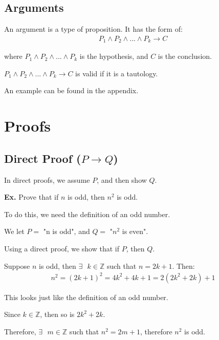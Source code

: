 \documentclass[12pt,letterpaper]{article} \usepackage{amsmath} \usepackage{graphicx}  \usepackage{longtable}  \usepackage{amssymb}
\begin{document}
        \subsection{Arguments}
        An argument is a type of proposition. It has the form of: 
        \begin{align*}
            P_1 \land P_2 \land ... \land P_k \rightarrow C
        \end{align*}

        where $P_1 \land P_2 \land ... \land P_k$ is the hypothesis, and $C$ is the conclusion. 

        $P_1 \land P_2 \land ... \land P_k \rightarrow C$ is valid if it is a tautology. 

        An example can be found in the appendix.

    \section{Proofs}

        \subsection{Direct Proof ($P \rightarrow Q$)}
        In direct proofs, we assume $P$, and then show $Q$. 

        \begin{mdframed}
            \textbf{Ex. } Prove that if $n$ is odd, then $n^2$ is odd.

            To do this, we need the definition of an odd number. 

            \begin{centering}


            \end{centering}

            We let $P = $ "n is odd", and $Q = $ "$n^2$ is even".

            Using a direct proof, we show that if $P$, then $Q$. 

            Suppose $n$ is odd, then $\exists \text{ } k\in\mathbb{Z}$ such that $n=2k+1$. Then:
            \begin{align*}
                n^2 = (2k+1)^2 = 4k^2 + 4k + 1 = 2(2k^2+2k)+1
            \end{align*}

            This looks just like the definition of an odd number.

            Since $k\in\mathbb{Z}$, then so is $2k^2+2k$.

            Therefore, $\exists \text{ } m\in\mathbb{Z}$ such that $n^2=2m+1$, therefore $n^2$ is odd.
        \end{mdframed}
\end{document}
